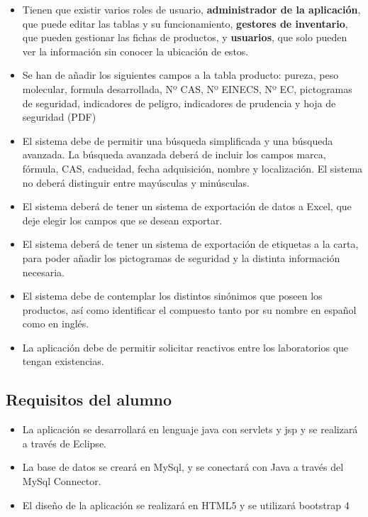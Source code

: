 \begin{itemize}

\item Tienen que existir varios roles de usuario, \textbf{administrador de la aplicación}, que puede editar las tablas y su funcionamiento, \textbf{gestores de inventario}, que pueden gestionar las fichas de productos, y \textbf{usuarios}, que solo pueden ver la información sin conocer la ubicación de estos.  

\item Se han de añadir los siguientes campos a la tabla producto: pureza, peso molecular, formula desarrollada, Nº CAS, Nº EINECS, Nº EC, pictogramas de seguridad, indicadores de peligro, indicadores de prudencia y hoja de seguridad (PDF)

\item El sistema debe de permitir una búsqueda simplificada y una búsqueda avanzada. La búsqueda avanzada deberá de incluir los campos marca, fórmula, CAS, caducidad, fecha adquisición, nombre y localización. El sistema no deberá distinguir entre mayúsculas y minúsculas.

\item El sistema deberá de tener un sistema de exportación de datos a Excel, que deje elegir los campos que se desean exportar.

\item El sistema deberá de tener un sistema de exportación de etiquetas a la carta, para poder añadir los pictogramas de seguridad y la distinta información necesaria.

\item El sistema debe de contemplar los distintos sinónimos que poseen los productos, así como identificar el compuesto tanto por su nombre en español como en inglés.
  
\item La aplicación debe de permitir solicitar reactivos entre los laboratorios que tengan existencias.

\end{itemize}

\subsection{Requisitos del alumno}

\begin{itemize}

\item La aplicación se desarrollará en lenguaje java con servlets y jsp y se realizará a través de Eclipse.

\item La base de datos se creará en MySql, y se conectará con Java a través del MySql Connector.

\item El diseño de la aplicación se realizará en HTML5 y se utilizará bootstrap 4 

\end{itemize}

